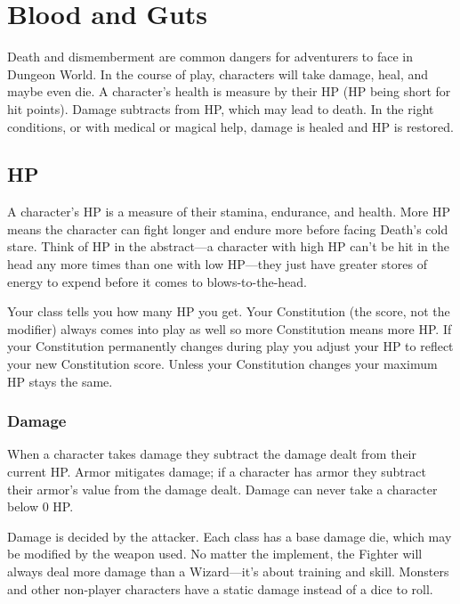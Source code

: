\chapter{Blood and Guts}
   
 



Death and dismemberment are common dangers for adventurers to face in Dungeon World. In the course of play, characters will take damage, heal, and maybe even die. A character's health is measure by their HP (HP being short for hit points). Damage subtracts from HP, which may lead to death. In the right conditions, or with medical or magical help, damage is healed and HP is restored.

 
\section{HP}   
 

A character's HP is a measure of their stamina, endurance, and health. More HP means the character can fight longer and endure more before facing Death's cold stare. Think of HP in the abstract—a character with high HP can't be hit in the head any more times than one with low HP—they just have greater stores of energy to expend before it comes to blows-to-the-head.

 

Your class tells you how many HP you get. Your Constitution (the score, not the modifier) always comes into play as well so more Constitution means more HP. If your Constitution permanently changes during play you adjust your HP to reflect your new Constitution score. Unless your Constitution changes your maximum HP stays the same.

 
\subsection{Damage}   
 

When a character takes damage they subtract the damage dealt from their current HP. Armor mitigates damage; if a character has armor they subtract their armor's value from the damage dealt. Damage can never take a character below 0 HP.

 

Damage is decided by the attacker. Each class has a base damage die, which may be modified by the weapon used. No matter the implement, the Fighter will always deal more damage than a Wizard—it's about training and skill. Monsters and other non-player characters have a static damage instead of a dice to roll.

